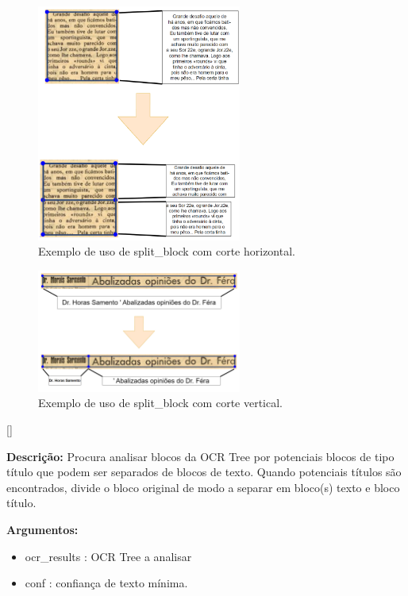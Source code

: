 \begin{figure}[H]
	\centering
	\includegraphics[width=0.6\textwidth]{images/ilustracoes/split_block_horizontal.png}
	\caption{Exemplo de uso de split\_block com corte horizontal.}
	\label{fig:split_block_horizontal}
\end{figure}

\begin{figure}[H]
	\centering
	\includegraphics[width=0.6\textwidth]{images/ilustracoes/split_block_vertical.png}
	\caption{Exemplo de uso de split\_block com corte vertical.}
	\label{fig:split_block_vertical}
\end{figure}



[\normalsize]

\textbf{Descrição:} Procura analisar blocos da OCR Tree por potenciais blocos de tipo título que podem ser separados de blocos de texto. Quando potenciais títulos são encontrados, divide o bloco original de modo a separar em bloco(s) texto e bloco título.

\textbf{Argumentos:}
\begin{itemize}\setlength\itemsep{-0.3em}
	\item ocr\_results : OCR Tree a analisar
	\item conf : confiança de texto mínima.
\end{itemize}


